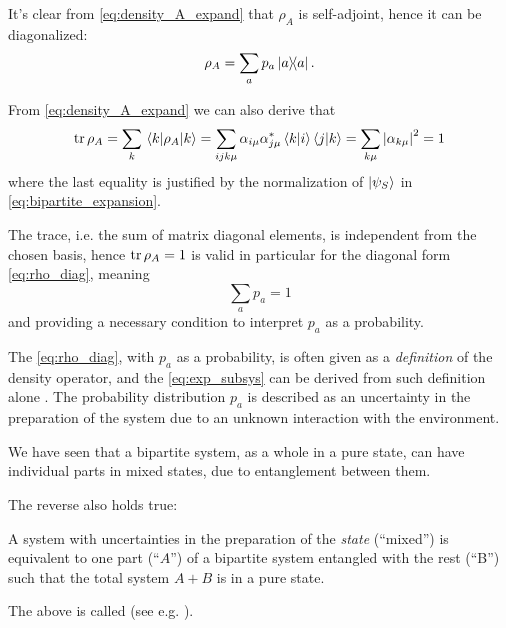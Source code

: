 It's clear from \eqref{eq:density_A_expand} that $\rho_A$ is self-adjoint,
hence it can be diagonalized:
\begin{equation}\label{eq:rho_diag}
  \rho_A = \sum_a p_a \ketbra{a}{a} \text{.}
\end{equation}

From \eqref{eq:density_A_expand} we can also derive that
\begin{equation}
  \tr\rho_A = \sum_k \mel{k}{\rho_A}{k} =
    \sum_{ijk\mu}\alpha_{i\mu}\alpha_{j\mu}^{*}\braket{k}{i}\braket{j}{k} =
    \sum_{k\mu}\abs{\alpha_{k\mu}}^2 = 1
\end{equation}
where the last equality is justified by the normalization of $\ket{\psi_S}$
in \eqref{eq:bipartite_expansion}.

The trace, i.e. the sum of matrix diagonal elements, is independent
from the chosen basis, hence $\tr\rho_A = 1$ is valid in particular
for the diagonal form \eqref{eq:rho_diag}, meaning
\[
  \sum_a p_a = 1
\]
and providing a necessary condition to interpret $p_a$ as a probability.

The \eqref{eq:rho_diag}, with $p_a$ as a probability, is often
given as a \emph{definition} of the density operator,
and the \eqref{eq:exp_subsys} can be derived from
such definition alone \parencite{open_systems}.
The probability distribution ${p_a}$
is described as an uncertainty in the preparation of the system
due to an unknown interaction with the environment.

We have seen that a bipartite system, as a whole in a pure state,
can have individual parts in mixed states, due to entanglement between them.

The reverse also holds true:
\begin{proposition}
A system with uncertainties in the preparation of the \emph{state}
(``mixed'') is equivalent to one part (``$A$'') of a bipartite system
entangled with the rest (``B'') such that the total system
$A+B$ is in a pure state.
\end{proposition}

The above is called  (see e.g. \cite[\S 2.5]{NielsenChuang}).

